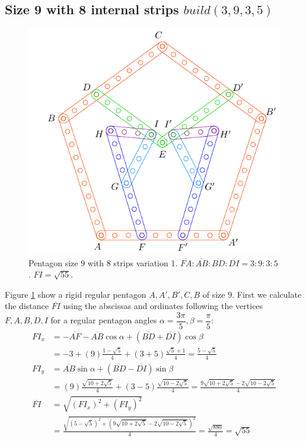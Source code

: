 \documentclass[11pt]{article}
\begin{document}
\subsection{Size 9 with 8 internal strips $build(3,9,3,5)$}

\begin{figure}[H]
 \centering
 \includegraphics[scale=0.95]{9/penta9-8a}
 \caption{Pentagon size 9 with 8 strips variation 1. $\overline{FA}:\overline{AB}:\overline{BD}:\overline{DI} = 3:9:3:5$. $\overline{FI} = \sqrt{55}$.}
 \label{fig:penta9-8a}
\end{figure}

Figure \ref{fig:penta9-8a} show a rigid regular pentagon $A,A',B',C,B$ of size $9$. First we calculate the distance $\overline{FI}$ using the abscissas and ordinates following the vertices $F,A,B,D,I$ for a regular pentagon angles $\alpha=\dfrac{3\pi}5, \beta=\dfrac{\pi}5$:
\begin{align}
FI_x &= -\overline{AF} - \overline{AB}\cos\alpha + (\overline{BD} + \overline{DI})\cos\beta\nonumber\\
 &= -3 + (9)\frac{1-\sqrt5}4 + (3+5)\frac{\sqrt5+1}4 = \frac{5-\sqrt5}4\\
FI_y &= \overline{AB}\sin\alpha + (\overline{BD}-\overline{DI})\sin\beta\nonumber\\
 &= (9)\frac{\sqrt{10+2\sqrt5}}4 + (3-5)\frac{\sqrt{10-2\sqrt5}}4
 = \frac{9\sqrt{10+2\sqrt5} - 2\sqrt{10-2\sqrt5}}4\\
\overline{FI} &= \sqrt{(FI_x)^2 + (FI_y)^2}\nonumber\\
 &= \frac{\sqrt{(5-\sqrt5)^2 + (9\sqrt{10+2\sqrt5} - 2\sqrt{10-2\sqrt5})^2}}4
 = \frac{\sqrt{880}}4 = \sqrt{55}
\end{align}
\end{document}
